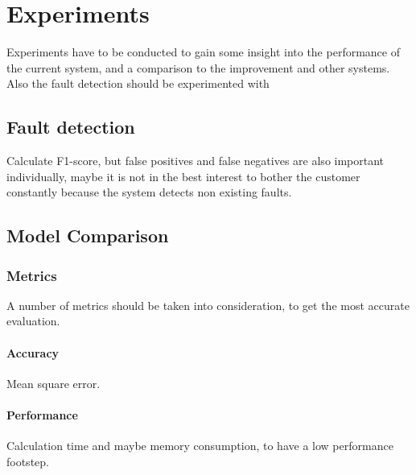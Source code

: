 \section{Experiments}

Experiments have to be conducted to gain some insight into the performance of the current system, and a comparison to the improvement and other systems. Also the fault detection should be experimented with

\subsection{Fault detection}

Calculate F1-score, but false positives and false negatives are also important individually, maybe it is not in the best interest to bother the customer constantly because the system detects non existing faults.

\subsection{Model Comparison}



\subsubsection{Metrics}

A number of metrics should be taken into consideration, to get the most accurate evaluation.

\paragraph{Accuracy}

Mean square error.

\paragraph{Performance}

Calculation time and maybe memory consumption, to have a low performance footstep.
